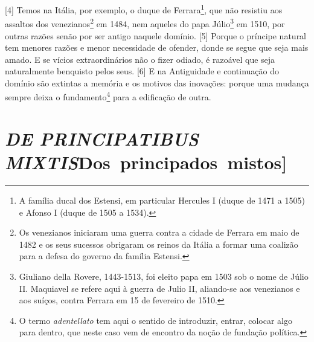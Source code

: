{[}4{]} Temos na Itália, por exemplo, o duque de Ferrara\footnote{A
  família ducal dos Estensi, em particular Hercules I (duque de 1471 a
  1505) e Afonso I (duque de 1505 a 1534).}, que não resistiu aos
assaltos dos venezianos\footnote{Os venezianos iniciaram uma guerra
  contra a cidade de Ferrara em maio de 1482 e os seus sucessos
  obrigaram os reinos da Itália a formar uma coalizão para a defesa do
  governo da família Estensi.} em 1484, nem aqueles do papa
Júlio\footnote{Giuliano della Rovere, 1443-1513, foi eleito papa em 1503
  sob o nome de Júlio II. Maquiavel se refere aqui à guerra de Julio II,
  aliando-se aos venezianos e aos suíços, contra Ferrara em 15 de
  fevereiro de 1510.} em 1510, por outras razões senão por ser antigo
naquele domínio. {[}5{]} Porque o príncipe natural tem menores razões e
menor necessidade de ofender, donde se segue que seja mais amado. E se
vícios extraordinários não o fizer odiado, é razoável que seja
naturalmente benquisto pelos seus. {[}6{]} E na Antiguidade e
continuação do domínio são extintas a memória e os motivos das
inovações: porque uma mudança sempre deixa o fundamento\footnote{O termo
  \emph{adentellato} tem aqui o sentido de introduzir, entrar, colocar
  algo para dentro, que neste caso vem de encontro da noção de fundação
  política.} para a edificação de outra.


\quebra\section{\emph{DE PRINCIPATIBUS MIXTIS}\break {[}Dos~principados~mistos{]}}

